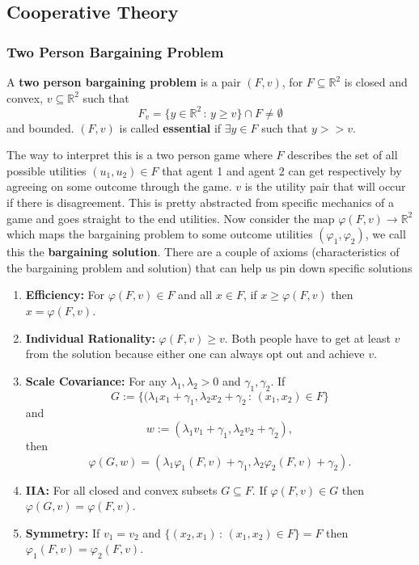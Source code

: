 \documentclass[11pt,english]{article}
\begin{document}
\subsection{Cooperative Theory}
\subsubsection{Two Person Bargaining Problem}
\begin{definition}
A \textbf{two person bargaining problem} is a pair $(F,v)$, for $F\subseteq \mathbb{R}^2$ is closed and convex, $v \subseteq \mathbb{R}^2$ such that $$F_v = \{y\in \mathbb{R}^2\,:\, y \geq v\}\cap F \neq \emptyset$$ and bounded. $(F,v)$ is called \textbf{essential} if $\exists y\in F$ such that $y >> v$.
\end{definition}
The way to interpret this is a two person game where $F$ describes the set of all possible utilities $(u_1, u_2)\in F$ that agent 1 and agent 2 can get respectively by agreeing on some outcome through the game. $v$ is the utility pair that will occur if there is disagreement. This is pretty abstracted from specific mechanics of a game and goes straight to the end utilities. Now consider the map $\varphi(F,v) \to \mathbb{R}^2$ which maps the bargaining problem to some outcome utilities $(\varphi_1, \varphi_2)$, we call this the \textbf{bargaining solution}. There are a couple of axioms (characteristics of the bargaining problem and solution) that can help us pin down specific solutions
\begin{enumerate}[label = (\roman*)]
\item \textbf{Efficiency:} For $\varphi(F, v) \in F$ and all $x\in F$, if $x \geq \varphi(F, v)$ then $x = \varphi (F, v)$.
\item \textbf{Individual Rationality:} $\varphi(F, v) \geq v$. Both people have to get at least $v$ from the solution because either one can always opt out and achieve $v$.
\item \textbf{Scale Covariance:} For any $\lambda_1, \lambda_2 > 0$ and $\gamma_1, \gamma_2$. If $$G := \{(\lambda_1 x_1 + \gamma_1, \lambda_2x_2 + \gamma_2\,:\,(x_1, x_2)\in F\}$$and $$w:= (\lambda_1 v_1 + \gamma_1, \lambda_2 v_2 + \gamma_2),$$then $$\varphi(G, w) = (\lambda_1 \varphi_1(F,v) + \gamma_1, \lambda_2\varphi_2(F, v) + \gamma_2).$$
\item \textbf{IIA:} For all closed and convex subsets $G \subseteq F$. If $\varphi(F, v) \in G$ then $\varphi(G,v) = \varphi(F, v)$.
\item \textbf{Symmetry:} If $v_1 = v_2$ and $\{(x_2, x_1)\,:\,(x_1, x_2)\in F\} = F$ then $\varphi_1(F, v) = \varphi_2(F, v)$.
\end{enumerate}
\end{document}
